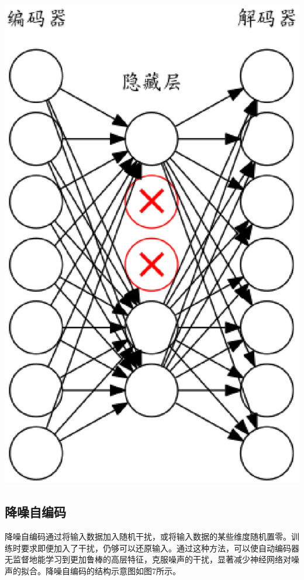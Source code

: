 \documentclass{ctacn}%
\begin{document}
\begin{multicols}{2}
\begin{center}
	\includegraphics[scale=0.14, trim=0 0 0 0]{figs/dropout}\\
	\label{fig7}
\end{center}

\subsection{降噪自编码}
降噪自编码通过将输入数据加入随机干扰，或将输入数据的某些维度随机置零。训练时要求即便加入了干扰，仍够可以还原输入。通过这种方法，可以使自动编码器无监督地能学习到更加鲁棒的高层特征，克服噪声的干扰，显著减少神经网络对噪声的拟合。降噪自编码的结构示意图如图7所示。



\end{multicols}
\end{document}
